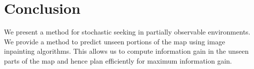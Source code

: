 \section{Conclusion}
We present a method for stochastic seeking in partially observable environments. 
We provide a method to  predict unseen portions of the map using image inpainting algorithms.
This allows us to compute information gain in the unseen parts of the map and hence plan efficiently for maximum information gain.